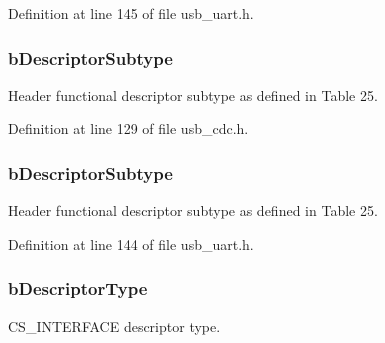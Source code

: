 Definition at line 145 of file usb\-\_\-uart.\-h.

\hypertarget{struct_u_s_b___header___functional___descriptor_a647561cc46bc5a0d3e0d9e962c43c605}{
\subsubsection[{b\-Descriptor\-Subtype}]{ b\-Descriptor\-Subtype}}\label{struct_u_s_b___header___functional___descriptor_a647561cc46bc5a0d3e0d9e962c43c605}
Header functional descriptor subtype as defined in Table 25. 

Definition at line 129 of file usb\-\_\-cdc.\-h.

\hypertarget{struct_u_s_b___header___functional___descriptor_a8ad9638618bb89c49f9c1490311ab1d5}{
\subsubsection[{b\-Descriptor\-Subtype}]{ b\-Descriptor\-Subtype}}\label{struct_u_s_b___header___functional___descriptor_a8ad9638618bb89c49f9c1490311ab1d5}
Header functional descriptor subtype as defined in Table 25. 

Definition at line 144 of file usb\-\_\-uart.\-h.

\hypertarget{struct_u_s_b___header___functional___descriptor_af6d6c7e334878414c973fc10e54cfb4e}{
\subsubsection[{b\-Descriptor\-Type}]{ b\-Descriptor\-Type}}\label{struct_u_s_b___header___functional___descriptor_af6d6c7e334878414c973fc10e54cfb4e}
C\-S\-\_\-\-I\-N\-T\-E\-R\-F\-A\-C\-E descriptor type. 

